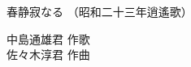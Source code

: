 \documentclass[10pt,b5j]{tarticle} %
\begin{document}
\begin{minipage}[c]{0.7\hsize} %
    \begin{center}
        {\LARGE
            春静寂なる %
        }
        {\small 
            （昭和二十三年逍遙歌） %
        }
    \end{center}
\end{minipage}
\begin{minipage}[c]{0.3\hsize} %
    \begin{flushright} %
        中島通雄君 作歌\\佐々木淳君 作曲 %
    \end{flushright}
\end{minipage}
\end{document}
